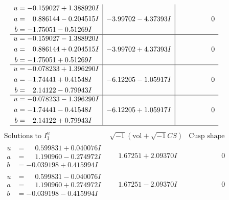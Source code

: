 \documentclass[1p]{elsarticle_modified}
\theoremstyle{definition}
\newcommand{\I}{\sqrt{-1}}
\begin{document}
$$\begin{array}{c|c|c}
\begin{aligned}
u &= -0.159027 + 1.388920 I \\
a &= \phantom{-}0.886144 - 0.204515 I \\
b &= -1.75051 - 0.51269 I\end{aligned}
 & -3.99702 - 4.37393 I & \phantom{-0.000000 } 0 \\ \hline\begin{aligned}
u &= -0.159027 - 1.388920 I \\
a &= \phantom{-}0.886144 + 0.204515 I \\
b &= -1.75051 + 0.51269 I\end{aligned}
 & -3.99702 + 4.37393 I & \phantom{-0.000000 } 0 \\ \hline\begin{aligned}
u &= -0.078233 + 1.396290 I \\
a &= -1.74441 + 0.41548 I \\
b &= \phantom{-}2.14122 - 0.79943 I\end{aligned}
 & -6.12205 - 1.05917 I & \phantom{-0.000000 } 0 \\ \hline\begin{aligned}
u &= -0.078233 - 1.396290 I \\
a &= -1.74441 - 0.41548 I \\
b &= \phantom{-}2.14122 + 0.79943 I\end{aligned}
 & -6.12205 + 1.05917 I & \phantom{-0.000000 } 0\\
 \hline 
 \end{array}$$\newpage$$\begin{array}{c|c|c}  
\text{Solutions to }I^u_{1}& \I (\text{vol} + \sqrt{-1}CS) & \text{Cusp shape}\\
 \hline 
\begin{aligned}
u &= \phantom{-}0.599831 + 0.040076 I \\
a &= \phantom{-}1.190960 - 0.274972 I \\
b &= -0.039198 + 0.415994 I\end{aligned}
 & \phantom{-}1.67251 + 2.09370 I & \phantom{-0.000000 } 0 \\ \hline\begin{aligned}
u &= \phantom{-}0.599831 - 0.040076 I \\
a &= \phantom{-}1.190960 + 0.274972 I \\
b &= -0.039198 - 0.415994 I\end{aligned}
 & \phantom{-}1.67251 - 2.09370 I & \phantom{-0.000000 } 0 \\ \hline\begin{aligned}

\end{aligned}
\end{array}$$
\end{document}
